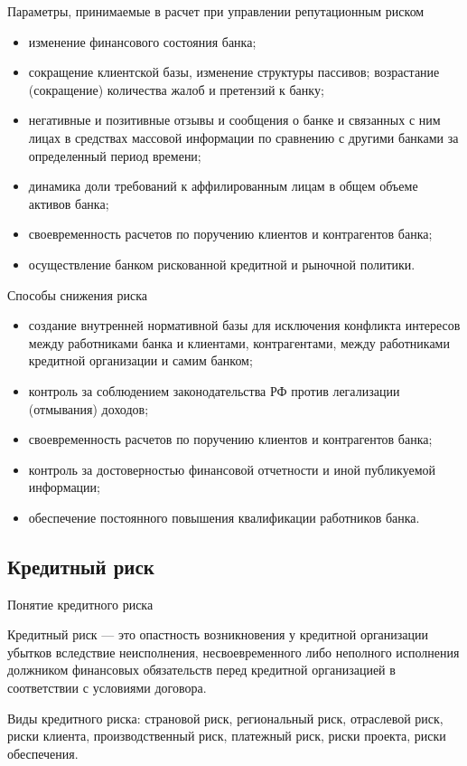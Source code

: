 \documentclass[financial_risks_lectures.tex]{subfiles}
\begin{document}
\begin{frame}[shrink=10]{Параметры, принимаемые в расчет при управлении репутационным риском}
\begin{itemize}[<+->]
\item
изменение финансового состояния банка;
\item
сокращение клиентской базы, изменение структуры пассивов;
возрастание (сокращение) количества жалоб и претензий к банку;
\item
негативные и позитивные отзывы и сообщения о банке и связанных с ним лицах в средствах массовой информации по сравнению с другими банками за определенный период времени;
\item
динамика доли требований к аффилированным лицам в общем объеме активов банка;
\item
своевременность расчетов по поручению клиентов и контрагентов банка;
\item
осуществление банком рискованной кредитной и рыночной политики.
\end{itemize}
\end{frame}

\begin{frame}[shrink=10]{Способы снижения риска}
\begin{itemize}[<+->]
\item
создание внутренней нормативной базы для исключения конфликта интересов между работниками банка и клиентами, контрагентами, между работниками кредитной организации и самим банком;
\item
контроль за соблюдением законодательства РФ против легализации (отмывания) доходов;
\item
своевременность расчетов по поручению клиентов и контрагентов банка;
\item
контроль за достоверностью финансовой отчетности и иной публикуемой информации;
\item
обеспечение постоянного повышения квалификации работников банка.
\end{itemize}
\end{frame}

\subsection{Кредитный риск}
\begin{frame}{Понятие кредитного риска}
\begin{block}{Кредитный риск}
\quad — это опастность возникновения у кредитной организации убытков вследствие неисполнения, несвоевременного либо неполного исполнения должником финансовых обязательств перед кредитной организацией в соответствии с условиями договора.
\end{block}
Виды кредитного риска: страновой риск, региональный риск, отраслевой риск, риски клиента, производственный риск, платежный риск, риски проекта, риски обеспечения.
\end{frame}
\end{document}
